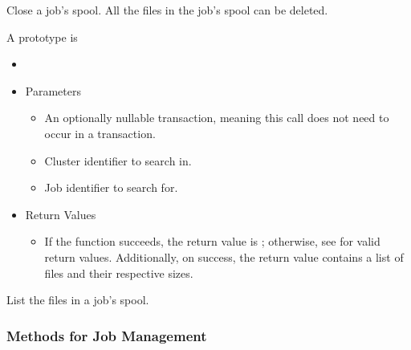 \begin{description}
  Close a job's spool.
  All the files in the job's spool can be deleted. 
\item [\Code{listSpool}]
  A prototype is 

  \begin{itemize}
    \item[] 
    \item[] Parameters
    \begin{itemize}
      \item[]  

      An optionally nullable transaction, meaning this call does not 
      need to occur in a transaction. 
      \item[]  

      Cluster identifier to search in.
      \item[] 

      Job identifier to search for.
    \end{itemize}
    \item[] Return Values
    \begin{itemize}
      \item[] If the function succeeds, the return value is ; 
      otherwise, see  for valid return values. Additionally,
      on success, the return value contains a list of files and their 
      respective sizes.
    \end{itemize}
  \end{itemize}  

  List the files in a job's spool.
\end{description}

\subsubsection{\label{WebService-JobManagement} Methods for Job Management}


